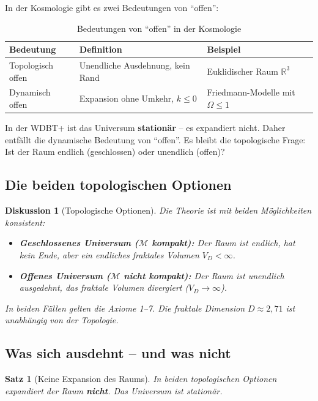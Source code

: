 \documentclass[12pt,a4paper]{article}
\newtheorem{satz}{Satz}
\newtheorem{diskussion}{Diskussion}
\begin{document}
In der Kosmologie gibt es zwei Bedeutungen von \enquote{offen}:

\begin{table}[h]
\centering
\caption{Bedeutungen von \enquote{offen} in der Kosmologie}
\begin{tabular}{|l|l|l|}
\hline
\textbf{Bedeutung} & \textbf{Definition} & \textbf{Beispiel} \\ \hline
Topologisch offen & Unendliche Ausdehnung, kein Rand & Euklidischer Raum $\mathbb{R}^3$ \\ \hline
Dynamisch offen & Expansion ohne Umkehr, $k \leq 0$ & Friedmann-Modelle mit $\Omega \leq 1$ \\ \hline
\end{tabular}
\end{table}

In der WDBT+ ist das Universum \textbf{stationär} – es expandiert nicht. Daher entfällt die dynamische Bedeutung von \enquote{offen}. Es bleibt die topologische Frage: Ist der Raum endlich (geschlossen) oder unendlich (offen)?

\subsection{Die beiden topologischen Optionen}

\begin{diskussion}[Topologische Optionen]
Die Theorie ist mit beiden Möglichkeiten konsistent:

\begin{itemize}
    \item \textbf{Geschlossenes Universum ($\mathcal{M}$ kompakt):} Der Raum ist endlich, hat kein Ende, aber ein endliches fraktales Volumen $V_D < \infty$.
    \item \textbf{Offenes Universum ($\mathcal{M}$ nicht kompakt):} Der Raum ist unendlich ausgedehnt, das fraktale Volumen divergiert ($V_D \to \infty$).
\end{itemize}

In beiden Fällen gelten die Axiome 1--7. Die fraktale Dimension $D \approx 2,71$ ist unabhängig von der Topologie.
\end{diskussion}

\subsection{Was sich ausdehnt – und was nicht}

\begin{satz}[Keine Expansion des Raums]
In beiden topologischen Optionen expandiert der Raum \textbf{nicht}. Das Universum ist stationär.
\end{satz}
\end{document}
